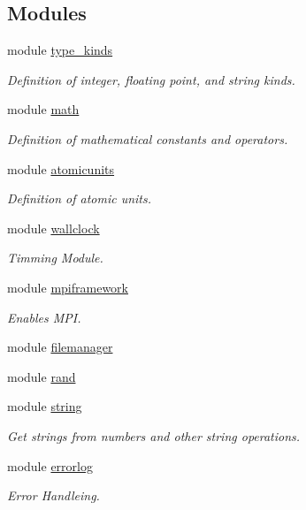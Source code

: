 \subsection*{Modules}
\begin{DoxyCompactItemize}
\item 
module \hyperlink{namespacetype__kinds}{type\+\_\+kinds}
\begin{DoxyCompactList}\small\item\em Definition of integer, floating point, and string kinds. \end{DoxyCompactList}\item 
module \hyperlink{namespacemath}{math}
\begin{DoxyCompactList}\small\item\em Definition of mathematical constants and operators. \end{DoxyCompactList}\item 
module \hyperlink{namespaceatomicunits}{atomicunits}
\begin{DoxyCompactList}\small\item\em Definition of atomic units. \end{DoxyCompactList}\item 
module \hyperlink{namespacewallclock}{wallclock}
\begin{DoxyCompactList}\small\item\em Timming Module. \end{DoxyCompactList}\item 
module \hyperlink{namespacempiframework}{mpiframework}
\begin{DoxyCompactList}\small\item\em Enables M\+PI. \end{DoxyCompactList}\item 
module \hyperlink{namespacefilemanager}{filemanager}
\item 
module \hyperlink{namespacerand}{rand}
\item 
module \hyperlink{namespacestring}{string}
\begin{DoxyCompactList}\small\item\em Get strings from numbers and other string operations. \end{DoxyCompactList}\item 
module \hyperlink{namespaceerrorlog}{errorlog}
\begin{DoxyCompactList}\small\item\em Error Handleing. \end{DoxyCompactList}\item 

\end{DoxyCompactItemize}
